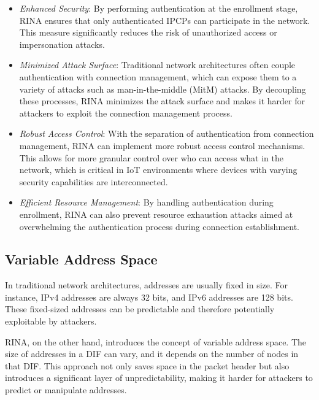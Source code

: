 \documentclass{ieeeaccess}
\begin{document}
\begin{itemize}
	\item \textit{Enhanced Security}: By performing authentication at the enrollment stage, RINA ensures that only authenticated IPCPs can participate in the network. This measure significantly reduces the risk of unauthorized access or impersonation attacks.
	\item \textit{Minimized Attack Surface}: Traditional network architectures often couple authentication with connection management, which can expose them to a variety of attacks such as man-in-the-middle (MitM) attacks. By decoupling these processes, RINA minimizes the attack surface and makes it harder for attackers to exploit the connection management process.
	\item \textit{Robust Access Control}: With the separation of authentication from connection management, RINA can implement more robust access control mechanisms. This allows for more granular control over who can access what in the network, which is critical in IoT environments where devices with varying security capabilities are interconnected.
	\item \textit{Efficient Resource Management}: By handling authentication during enrollment, RINA can also prevent resource exhaustion attacks aimed at overwhelming the authentication process during connection establishment.
\end{itemize}

\subsection{Variable Address Space}
In traditional network architectures, addresses are usually fixed in size. For instance, IPv4 addresses are always 32 bits, and IPv6 addresses are 128 bits. These fixed-sized addresses can be predictable and therefore potentially exploitable by attackers.

RINA, on the other hand, introduces the concept of variable address space. The size of addresses in a DIF can vary, and it depends on the number of nodes in that DIF. This approach not only saves space in the packet header but also introduces a significant layer of unpredictability, making it harder for attackers to predict or manipulate addresses.
\end{document}
